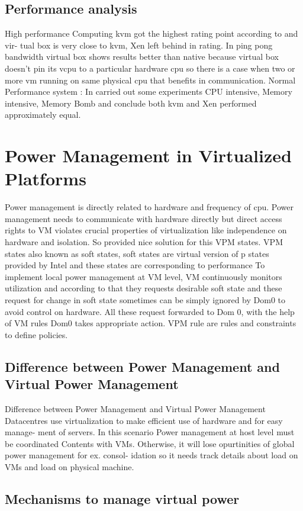 \documentclass[seminar,twoside]{iitbreport}
\begin{document}
\subsection{Performance analysis}
High performance Computing kvm got the highest rating point according to \cite{comparisonm} and vir-
tual box is very close to kvm, Xen left behind in rating. In ping pong bandwidth virtual
box shows results better than native because virtual box doesn’t pin its vcpu to a particular
hardware cpu so there is a case when two or more vm running on same physical cpu that
benefits in communication. Normal Performance system : In \cite{xenkvm2014} carried out some 
experiments CPU intensive, Memory intensive, Memory Bomb and conclude both kvm and Xen
performed approximately equal.
\section{Power Management in Virtualized Platforms}
Power management is directly related to hardware and frequency of cpu. Power management needs to communicate with hardware
directly but direct access rights to VM violates crucial properties of virtualization like
independence on hardware and isolation. So \cite{ripalm} provided nice solution for this VPM
states. VPM states also known as soft states, soft states are virtual version of p states provided by Intel and these
states are corresponding to performance To implement local power management at VM
level, VM continuously monitors utilization and according to that they requests desirable
soft state and these request for change in soft state sometimes can be simply ignored by
Dom0 to avoid control on hardware. All these request forwarded to Dom 0, with the help
of VM rules Dom0 takes appropriate action. VPM rule are rules and constraints to define
policies.
\subsection{Difference between Power Management and Virtual Power Management}
Difference between Power Management and Virtual Power Management
Datacentres use virtualization to make efficient use of hardware and for easy manage-
ment of servers. In this scenario Power management at host level must be coordinated
Contents with VMs. Otherwise, it will lose opurtinities of global power management for ex. consol-
idation so it needs track details about load on VMs and load on physical machine.
\subsection{Mechanisms to manage virtual power}
\end{document}
